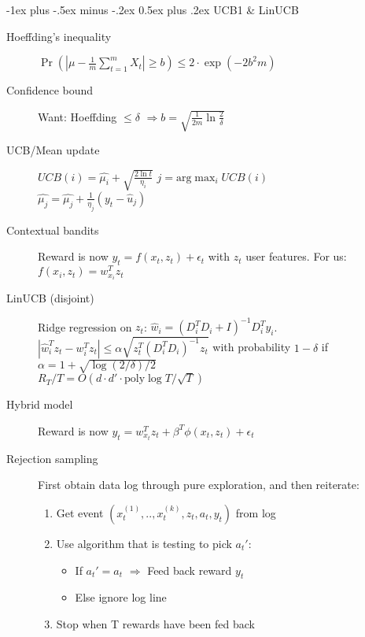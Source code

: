 \documentclass[11pt,landscape]{article}
\makeatletter
\renewcommand{\subsection}{\@startsection{subsection}{2}{0mm}%
                                {-1ex plus -.5ex minus -.2ex}%
                                {0.5ex plus .2ex}%
                                {\color{subsectionColor}\normalfont\normalsize\bfseries}}
\makeatother
\begin{document}
\begin{multicols}{3}
\subsection{UCB1 \& LinUCB}
\begin{description}
    \item[Hoeffding's inequality] $\Pr(|\mu - \frac{1}{m} \sum_{t=1}^m X_t | \geq b) \leq 2 \cdot \exp(-2b^2m)$
    \item[Confidence bound] Want: Hoeffding $\leq \delta$
        $\Rightarrow b = \sqrt{\frac{1}{2m}\ln\frac{2}{\delta}}$
    \item[UCB/Mean update]
    $UCB(i) = \hat{\mu_i}+ \sqrt{\frac{2 \ln t}{\eta_i}}$
        $j = \text{arg}\max_i UCB(i)$\\
    $\hat{\mu_j} = \hat{\mu_j} + \frac{1}{\eta_j} (y_t - \hat{u}_j)$
    \item[Contextual bandits] Reward is now $y_t = f(x_t,z_t) + \epsilon_t$ with $z_t$ user features. For us: $f(x_i,z_t) = w^T_{x_i}z_t$
    \item[LinUCB (disjoint)] Ridge regression on $z_t$:
        $\hat{w}_i = (D_i^TD_i + I)^{-1}D_i^Ty_i$.\\
        $|\hat{w}_i^Tz_t - w_i^Tz_t| \leq \alpha \sqrt{z_t^T(D_i^TD_i)^{-1}z_t}$ with
        probability $1-\delta$ if $\alpha = 1 + \sqrt{\log(2/\delta)/2}$\\
        $R_T/T = O(d \cdot d' \cdot \text{poly}\log T / \sqrt{T})$
    \item[Hybrid model] Reward is now $y_t = w^T_{x_t} z_t + \beta^T \phi(x_t,z_t) + \epsilon_t$
    \item[Rejection sampling] First obtain data log through pure exploration, and then reiterate:
    \begin{enumerate}
        \item Get event $(x_t^{(1)},..,x_t^{(k)},z_t,a_t,y_t)$ from log
        \item Use algorithm that is testing to pick $a_t'$:
        \begin{itemize}
            \item If $a_t'  = a_t$
            $\Rightarrow$ Feed back reward $y_t$
            \item Else ignore log line
        \end{itemize}
        \item Stop when T rewards have been fed back
    \end{enumerate}
\end{description}


\end{multicols}
\end{document}
